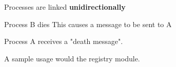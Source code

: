 \begin{frame}
\begin{overprint}
        \begin{center}
            Processes are linked \textbf{unidirectionally}
        \end{center}

        \begin{center}
            Process B dies
            \vskip2mm
            This causes a message to be sent to A
        \end{center}

        Process A receives a "death message".

        A sample usage would the registry module.
    \end{overprint}
\end{frame}
